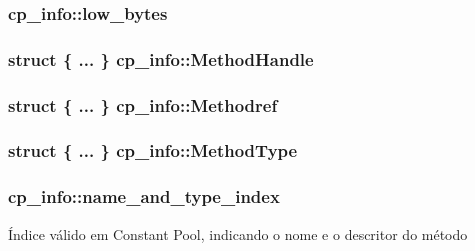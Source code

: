 \subsubsection[{\texorpdfstring{low\+\_\+bytes}{low_bytes}}]{ cp\+\_\+info\+::low\+\_\+bytes}\hypertarget{structcp__info_aff872b9dcff18e083ca9f73ef82ab14f}{}\label{structcp__info_aff872b9dcff18e083ca9f73ef82ab14f}
\subsubsection[{\texorpdfstring{Method\+Handle}{MethodHandle}}]{\setlength{\rightskip}{0pt plus 5cm}struct \{ ... \}   cp\+\_\+info\+::\+Method\+Handle}\hypertarget{structcp__info_aa2e7ee141904f8a1478412f2c216bcd8}{}\label{structcp__info_aa2e7ee141904f8a1478412f2c216bcd8}
\subsubsection[{\texorpdfstring{Methodref}{Methodref}}]{\setlength{\rightskip}{0pt plus 5cm}struct \{ ... \}   cp\+\_\+info\+::\+Methodref}\hypertarget{structcp__info_a4afc97985c76278f209a037ed49247cd}{}\label{structcp__info_a4afc97985c76278f209a037ed49247cd}
\subsubsection[{\texorpdfstring{Method\+Type}{MethodType}}]{\setlength{\rightskip}{0pt plus 5cm}struct \{ ... \}   cp\+\_\+info\+::\+Method\+Type}\hypertarget{structcp__info_acc187adbe8e183174d18d0b17f94d21f}{}\label{structcp__info_acc187adbe8e183174d18d0b17f94d21f}
\subsubsection[{\texorpdfstring{name\+\_\+and\+\_\+type\+\_\+index}{name_and_type_index}}]{ cp\+\_\+info\+::name\+\_\+and\+\_\+type\+\_\+index}\hypertarget{structcp__info_a1b947f3ff3eee58acf5500debf45848c}{}\label{structcp__info_a1b947f3ff3eee58acf5500debf45848c}
Índice válido em Constant Pool, indicando o nome e o descritor do método 

